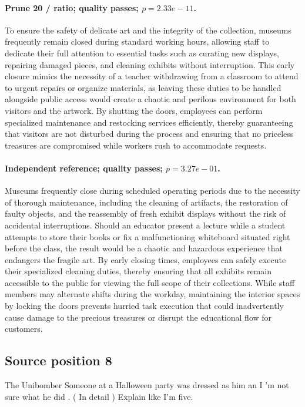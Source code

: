\paragraph{Prune 20 / ratio; quality passes; $p=2.33e-11$.} To ensure the safety of delicate art and the integrity of the collection, museums frequently remain closed during standard working hours, allowing staff to dedicate their full attention to essential tasks such as curating new displays, repairing damaged pieces, and cleaning exhibits without interruption. This early closure mimics the necessity of a teacher withdrawing from a classroom to attend to urgent repairs or organize materials, as leaving these duties to be handled alongside public access would create a chaotic and perilous environment for both visitors and the artwork. By shutting the doors, employees can perform specialized maintenance and restocking services efficiently, thereby guaranteeing that visitors are not disturbed during the process and ensuring that no priceless treasures are compromised while workers rush to accommodate requests.

\paragraph{Independent reference; quality passes; $p=3.27e-01$.} Museums frequently close during scheduled operating periods due to the necessity of thorough maintenance, including the cleaning of artifacts, the restoration of faulty objects, and the reassembly of fresh exhibit displays without the risk of accidental interruptions. Should an educator present a lecture while a student attempts to store their books or fix a malfunctioning whiteboard situated right before the class, the result would be a chaotic and hazardous experience that endangers the fragile art. By early closing times, employees can safely execute their specialized cleaning duties, thereby ensuring that all exhibits remain accessible to the public for viewing the full scope of their collections. While staff members may alternate shifts during the workday, maintaining the interior spaces by locking the doors prevents hurried task execution that could inadvertently cause damage to the precious treasures or disrupt the educational flow for customers.

\subsection*{Source position 8}
The Unibomber Someone at a Halloween party was dressed as him an I 'm not sure what he did . ( In detail ) Explain like I'm five.

